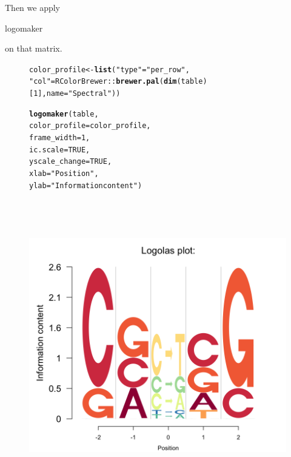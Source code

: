 \documentclass[12pt]{article}\usepackage[]{graphicx}\usepackage[usenames,dvipsnames]{color}
\makeatletter
\newcommand{\hlnum}[1]{\textcolor[rgb]{0.686,0.059,0.569}{#1}}%
\newcommand{\hlstr}[1]{\textcolor[rgb]{0.192,0.494,0.8}{#1}}%
\newcommand{\hlopt}[1]{\textcolor[rgb]{0,0,0}{#1}}%
\newcommand{\hlstd}[1]{\textcolor[rgb]{0.345,0.345,0.345}{#1}}%
\newcommand{\hlkwb}[1]{\textcolor[rgb]{0.69,0.353,0.396}{#1}}%
\newcommand{\hlkwc}[1]{\textcolor[rgb]{0.333,0.667,0.333}{#1}}%
\newcommand{\hlkwd}[1]{\textcolor[rgb]{0.737,0.353,0.396}{\textbf{#1}}}%
\newenvironment{kframe}{%
 \def\at@end@of@kframe{}%
 \ifinner\ifhmode%
  \def\at@end@of@kframe{\end{minipage}}%
  \begin{minipage}{\columnwidth}%
 \fi\fi%
 \def\FrameCommand##1{\hskip\@totalleftmargin \hskip-\fboxsep
 \colorbox{shadecolor}{##1}\hskip-\fboxsep
     \hskip-\linewidth \hskip-\@totalleftmargin \hskip\columnwidth}%
 \MakeFramed {\advance\hsize-\width
   \@totalleftmargin\z@ \linewidth\hsize
   \@setminipage}}%
 {\par\unskip\endMakeFramed%
 \at@end@of@kframe}
\newenvironment{knitrout}{}{} %
\makeatother
\begin{document}
Then we apply \begin{verb} logomaker \end{verb} on that matrix.

\begin{figure}[htp]
\begin{center}
\begin{knitrout}
\color{fgcolor}\begin{kframe}
\begin{alltt}
\hlstd{color_profile} \hlkwb{<-} \hlkwd{list}\hlstd{(}\hlstr{"type"} \hlstd{=} \hlstr{"per_row"}\hlstd{,}
                      \hlstr{"col"} \hlstd{= RColorBrewer}\hlopt{::}\hlkwd{brewer.pal}\hlstd{(}\hlkwd{dim}\hlstd{(table)[}\hlnum{1}\hlstd{],}\hlkwc{name} \hlstd{=}\hlstr{"Spectral"}\hlstd{))}

\hlkwd{logomaker}\hlstd{(table,}
          \hlkwc{color_profile} \hlstd{= color_profile,}
          \hlkwc{frame_width} \hlstd{=} \hlnum{1}\hlstd{,}
          \hlkwc{ic.scale} \hlstd{=} \hlnum{TRUE}\hlstd{,}
          \hlkwc{yscale_change}\hlstd{=}\hlnum{TRUE}\hlstd{,}
          \hlkwc{xlab} \hlstd{=} \hlstr{"Position"}\hlstd{,}
          \hlkwc{ylab} \hlstd{=} \hlstr{"Information content"}\hlstd{)}
\end{alltt}
\end{kframe}
\includegraphics[width=6in,height=5in]{figure/logolas_use_7_0-1} 

\end{knitrout}
\end{center}
\end{figure}
\end{document}
